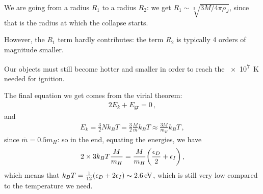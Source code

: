 \documentclass[main.tex]{subfiles}
\begin{document}
We are going from a radius \(R_1 \) to a radius \(R_2 \): we get \(R_1 \sim \sqrt[3]{3 M / 4 \pi \rho _J}\), since that is the radius at which the collapse starts. 

However, the \(R_1 \) term hardly contributes: the term \(R_2 \) is typically 4 orders of magnitude smaller. 

Our objects must still become hotter and smaller in order to reach the \SI{e7}{K} needed for ignition. 

The final equation we  get comes from the  virial theorem:
%
\begin{align}
  2E_{k} + E _{\text{gr}} =0
\,,
\end{align}
%
and 
%
\begin{align}
  E_k = \frac{3}{2} N k_B T = \frac{3}{2} \frac{M}{\overline{m}} k_B T \approx \frac{3M}{m_H} k_B T
\,,
\end{align}
%
since \(\overline{m} = 0.5 m_H\): so in the end, equating the energies, we have 
%
\begin{align}
  2 \times 3 k_B T \frac{M}{m_H }
  = \frac{M}{m_H} \qty(\frac{\epsilon_{D}}{2} + \epsilon_{I})
\,,
\end{align}
%
which means that \(k_B T = \frac{1}{12} \qty(\epsilon_{D} + 2 \epsilon_{I}) \sim \SI{2.6}{eV}\), which is still very low compared to the temperature we need. 
\end{document}
